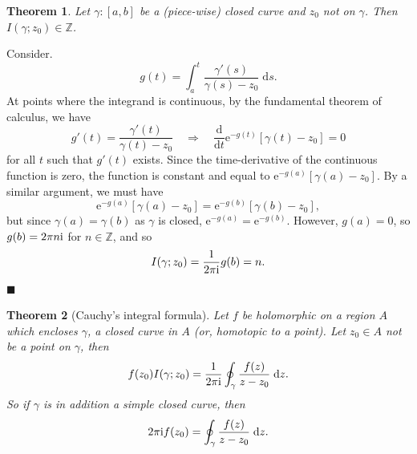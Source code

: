 \documentclass[letter-paper]{tufte-book}
\newtheorem{theorem}{\color{pastel-blue}Theorem}[section]
\newenvironment{proof}[1][Proof]{\begin{trivlist}
\item[\hskip \labelsep {\bfseries #1}]}{\end{trivlist}}
\newcommand{\ex}{\mathrm{e}}
\newcommand{\zi}{{\rm i}}
\newcommand{\qed}{\hfill$\blacksquare$}
\begin{document}
\begin{theorem}
  Let $\gamma : [a,b]$ be a (piece-wise) closed curve and $z_0$ not on $\gamma$.
  Then $I(\gamma; z_0) \in \mathbb{Z}$.
\end{theorem}
\begin{proof}
  Consider.
  \begin{equation*}
    g(t) = \int_a^t \frac{\gamma'(s)}{\gamma(s) - z_0}\; \mathrm{d}s.
  \end{equation*}
  At points where the integrand is continuous, by the fundamental theorem of
  calculus, we have
  \begin{equation*}
    g'(t) = \frac{\gamma'(t)}{\gamma(t) - z_0} \quad \Rightarrow \quad \frac{\mathrm{d}}{\mathrm{d}t} \ex^{-g(t)}[\gamma(t) - z_0] = 0
  \end{equation*}
  for all $t$ such that $g'(t)$ exists. Since the time-derivative of the
  continuous function is zero, the function is constant and equal to
  $\ex^{-g(a)}[\gamma(a) - z_0]$. By a similar argument, we must have
  \begin{equation*}
    \ex^{-g(a)}[\gamma(a) - z_0] = \ex^{-g(b)}[\gamma(b) - z_0],
  \end{equation*}
  but since $\gamma(a) = \gamma(b)$ as $\gamma$ is closed, $\ex^{-g(a)} =
  \ex^{-g(b)}$. However, $g(a) = 0$, so $g(b) = 2\pi n\zi$ for $n\in\mathbb{Z}$,
  and so
  \begin{equation*}
    I(\gamma; z_0) = \frac{1}{2\pi\zi}g(b) = n.
  \end{equation*}
  \qed
\end{proof}

\begin{theorem}[Cauchy's integral formula]
  Let $f$ be holomorphic on a region $A$ which encloses $\gamma$, a closed curve
  in $A$ (or, \emph{homotopic} to a point). Let $z_0 \in A$ not be a point on
  $\gamma$, then
  \begin{equation}
    f(z_0) I(\gamma; z_0) = \frac{1}{2\pi\zi} \oint_\gamma \frac{f(z)}{z - z_0}\; \mathrm{d}z.
  \end{equation}
  So if $\gamma$ is in addition a simple closed curve, then
  \begin{equation}
    2\pi\zi f(z_0) = \oint_\gamma \frac{f(z)}{z - z_0}\; \mathrm{d}z.
  \end{equation}
\end{theorem}
\end{document}
